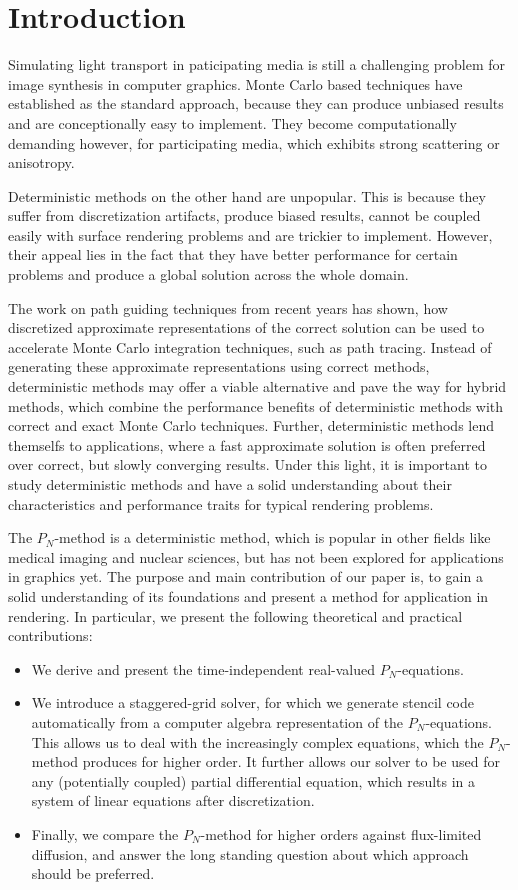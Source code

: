 \section{Introduction}

Simulating light transport in paticipating media is still a challenging problem for image synthesis in computer graphics. Monte Carlo based techniques have established as the standard approach, because they can produce unbiased results and are conceptionally easy to implement. They become computationally demanding however, for participating media, which exhibits strong scattering or anisotropy.

Deterministic methods on the other hand are unpopular. This is because they suffer from discretization artifacts, produce biased results, cannot be coupled easily with surface rendering problems and are trickier to implement. However, their appeal lies in the fact that they have better performance for certain problems and produce a global solution across the whole domain.

The work on path guiding techniques from recent years has shown, how discretized approximate representations of the correct solution can be used to accelerate Monte Carlo integration techniques, such as path tracing. Instead of generating these approximate representations using correct methods, deterministic methods may offer a viable alternative and pave the way for hybrid methods, which combine the performance benefits of deterministic methods with correct and exact Monte Carlo techniques. Further, deterministic methods lend themselfs to applications, where a fast approximate solution is often preferred over correct, but slowly converging results. Under this light, it is important to study deterministic methods and have a solid understanding about their characteristics and performance traits for typical rendering problems.

The $P_N$-method is a deterministic method, which is popular in other fields like medical imaging and nuclear sciences, but has not been explored for applications in graphics yet. The purpose and main contribution of our paper is, to gain a solid understanding of its foundations and present a method for application in rendering. In particular, we present the following theoretical and practical contributions:
\begin{itemize}
	\item We derive and present the time-independent real-valued $P_N$-equations.
	\item We introduce a staggered-grid solver, for which we generate stencil code automatically from a computer algebra representation of the $P_N$-equations. This allows us to deal with the increasingly complex equations, which the $P_N$-method produces for higher order. It further allows our solver to be used for any (potentially coupled) partial differential equation, which results in a system of linear equations after discretization.
	\item Finally, we compare the $P_N$-method for higher orders against flux-limited diffusion, and answer the long standing question about which approach should be preferred.
\end{itemize}

